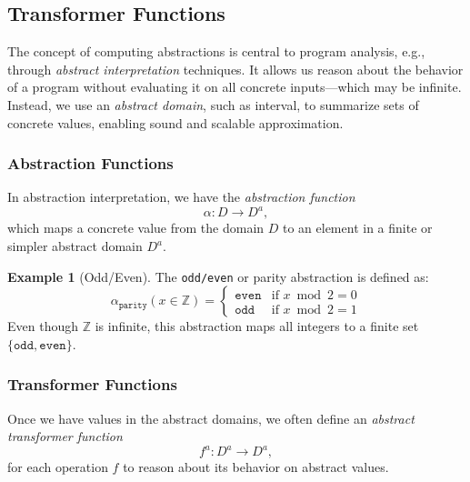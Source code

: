 \documentclass[oneside,11pt,dvipsnames]{book}
\numberwithin{equation}{section}
\theoremstyle{definition}
\newtheorem{example}{Example}[section]
\theoremstyle{remark}
\begin{document}
\subsection{Transformer Functions}\label{sec:transformer-functions}

The concept of computing abstractions is central to program analysis, e.g., through \emph{abstract interpretation} techniques.
It allows us reason about the behavior of a program without evaluating it on all concrete inputs---which may be infinite. Instead, we use an \emph{abstract domain}, such as interval, to summarize sets of concrete values, enabling sound and scalable approximation.


\subsubsection{Abstraction Functions} In abstraction interpretation, we have the \emph{abstraction function}
\[
\alpha : D \to D^a,
\]
which maps a concrete value from the domain $D$ to an element in a finite or simpler abstract domain $D^a$.

\begin{example}[Odd/Even]
    The \texttt{odd/even} or parity abstraction is defined as:
\[
\alpha_{\texttt{parity}}(x \in \mathbb{Z}) =
\begin{cases}
\texttt{even} & \text{if } x \bmod 2 = 0 \\
\texttt{odd}  & \text{if } x \bmod 2 = 1
\end{cases}
\]
Even though $\mathbb{Z}$ is infinite, this abstraction maps all integers to a finite set $\{\texttt{odd}, \texttt{even}\}$.
\end{example}

\subsubsection{Transformer Functions} Once we have values in the abstract domains, we often define an \emph{abstract transformer function}
\[
f^a : D^a \to D^a,
\]
for each operation \(f\) to reason about its behavior on abstract values.
\end{document}
